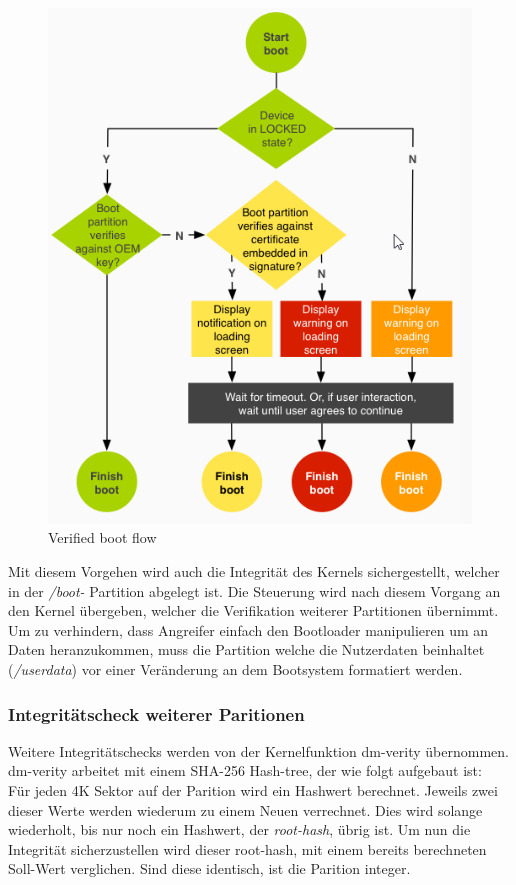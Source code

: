 	\begin{figure}[h]
		\centering
		\includegraphics[width=0.7\linewidth, height=0.5\textheight]{android_pages/graphics/VerifiedBoot}
		\caption[Verified boot flow\protect\cite{VerifyingBoot}]{Verified boot flow\protect\cite{VerifyingBoot}}
		\label{fig:VerifiedBoot}
	\end{figure}
	
\begin{flushleft}
	Mit diesem Vorgehen wird auch die Integrität des Kernels sichergestellt, welcher in der \textit{/boot-} Partition abgelegt ist. Die Steuerung wird nach diesem Vorgang an den Kernel übergeben, welcher die Verifikation weiterer Partitionen übernimmt.\newline\\

	Um zu verhindern, dass Angreifer einfach den Bootloader manipulieren um an Daten heranzukommen, muss die Partition welche die Nutzerdaten beinhaltet (\textit{/userdata}) vor einer Veränderung an dem Bootsystem formatiert werden.
\end{flushleft}
	
	\subsubsection{Integritätscheck weiterer Paritionen}
	Weitere Integritätschecks werden von der Kernelfunktion dm-verity übernommen.
	dm-verity arbeitet mit einem SHA-256 Hash-tree, der wie folgt aufgebaut ist:\\
	Für jeden 4K Sektor auf der Parition wird ein Hashwert berechnet. Jeweils zwei dieser Werte werden wiederum zu einem Neuen verrechnet. Dies wird solange wiederholt, bis nur noch ein Hashwert, der \textit{root-hash}, übrig ist. Um nun die Integrität sicherzustellen wird dieser root-hash, mit einem bereits berechneten Soll-Wert verglichen. Sind diese identisch, ist die Parition integer.
	
